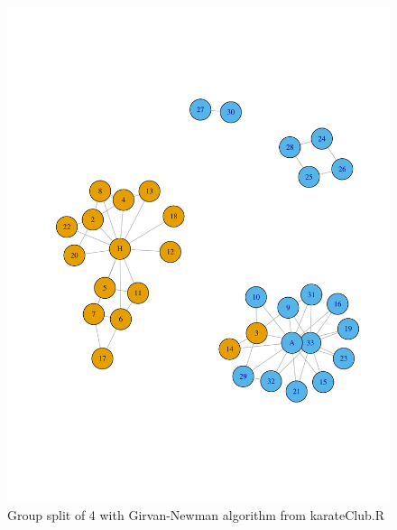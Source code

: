 \documentclass[letterpaper,11pt]{article}
\begin{document}
\begin{figure}[h]
\centering
\includegraphics[scale=0.6]{predictedSplit4.pdf}
\caption{Group split of 4 with Girvan-Newman algorithm from karateClub.R}
\label{fig:split4}
\end{figure}
\end{document}
